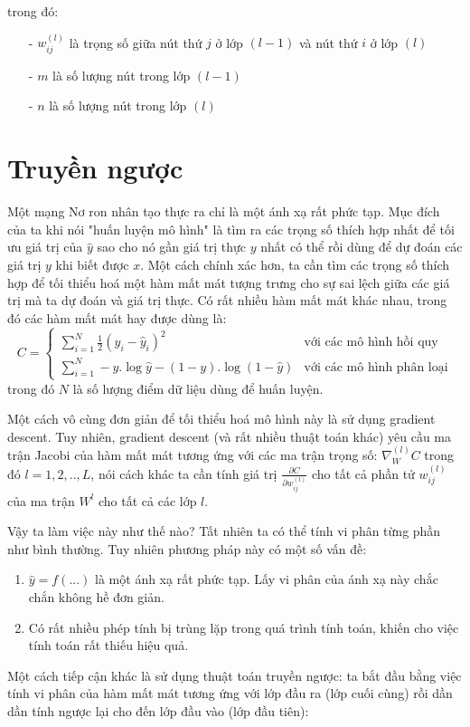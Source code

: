 \documentclass{article}
\begin{document}
trong đó:
\begin{itemize}
\item[-] $w^{(l)}_{ij}$ là trọng số giữa nút thứ $j$ ở lớp $(l - 1)$ và nút thứ $i$ ở lớp $(l)$

\item[-] $m$ là số lượng nút trong lớp $(l - 1)$

\item[-] $n$ là số lượng nút trong lớp $(l)$
\end{itemize}
\newpage
\section{Truyền ngược}

Một mạng Nơ ron nhân tạo thực ra chỉ là một ánh xạ rất phức tạp. Mục đích của ta khi nói "huấn luyện mô hình" là tìm ra các trọng số thích hợp nhất để tối ưu giá trị của $\hat{y}$ sao cho nó gần giá trị thực $y$ nhất có thể rồi dùng để dự đoán các giá trị $y$ khi biết được $x$. Một cách chính xác hơn, ta cần tìm các trọng số thích hợp để tối thiểu hoá một hàm mất mát tượng trưng cho sự sai lệch giữa các giá trị mà ta dự đoán và giá trị thực. Có rất nhiều hàm mất mát khác nhau, trong đó các hàm mất mát hay được dùng là:
\[C = 
\begin{cases}
\sum_{i=1}^{N} \frac{1}{2} \left( y_i - \hat{y}_i \right)^2 & \text{với các mô hình hồi quy}\\
\sum_{i=1}^{N} -y.\log{\hat{y}} - (1 - y).\log(1-\hat{y}) & \text{với các mô hình phân loại}
\end{cases}
\]
trong đó $N$ là số lượng điểm dữ liệu dùng để huấn luyện.

Một cách vô cùng đơn giản để tối thiểu hoá mô hình này là sử dụng gradient descent. Tuy nhiên, gradient descent (và rất nhiều thuật toán khác) yêu cầu ma trận Jacobi của hàm mất mát tương ứng với các ma trận trọng số: $\nabla_{W}^{(l)} C$ trong đó $l = 1, 2, .., L$, nói cách khác ta cần tính giá trị $\frac{\partial{C}}{\partial{w^{(l)}_{ij}}}$ cho tất cả phần tử $w^{(l)}_{ij}$ của ma trận $W^l$ cho tất cả các lớp $l$.

Vậy ta làm việc này như thế nào? Tất nhiên ta có thể tính vi phân từng phần như bình thường. Tuy nhiên phương pháp này có một số vấn đề:
\begin{enumerate}
    \item $\hat{y} = f(...)$ là một ánh xạ rất phức tạp. Lấy vi phân của ánh xạ này chắc chắn không hề đơn giản.
    \item Có rất nhiều phép tính bị trùng lặp trong quá trình tính toán, khiến cho việc tính toán rất thiếu hiệu quả.
\end{enumerate}
Một cách tiếp cận khác là sử dụng thuật toán truyền ngược: ta bắt đầu bằng việc tính vi phân của hàm mất mát tương ứng với lớp đầu ra (lớp cuối cùng) rồi dần dần tính ngược lại cho đến lớp đầu vào (lớp đầu tiên):
\end{document}

